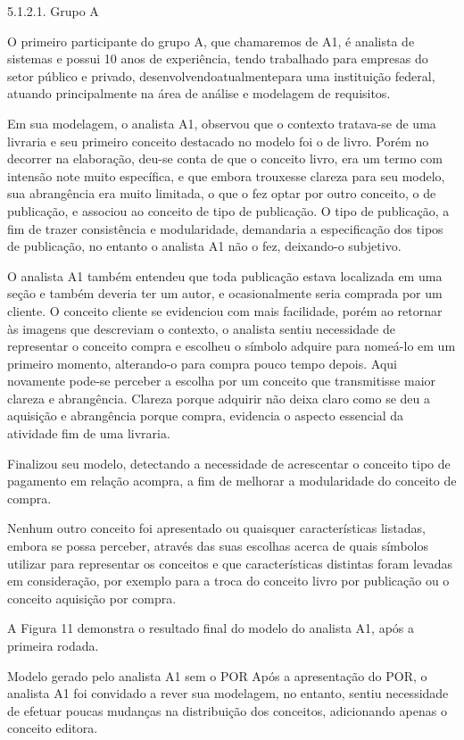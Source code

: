 5.1.2.1. Grupo A

O primeiro participante do grupo A, que chamaremos de A1, é analista de sistemas e possui 10 anos de experiência, tendo trabalhado para empresas do setor público e privado, desenvolvendoatualmentepara uma instituição federal, atuando principalmente na área de análise e modelagem de requisitos.

Em sua modelagem, o analista A1, observou que o contexto tratava-se de uma livraria e seu primeiro conceito destacado no modelo foi o de livro. Porém no decorrer na elaboração, deu-se conta de que o conceito livro, era um termo com intensão note muito específica, e que embora trouxesse clareza para seu modelo, sua abrangência era muito limitada, o que o fez optar por outro conceito, o de publicação, e associou ao conceito de tipo de publicação. O tipo de publicação, a fim de trazer consistência e modularidade, demandaria a especificação dos tipos de publicação, no entanto o analista A1 não o fez, deixando-o subjetivo.

O analista A1 também entendeu que toda publicação estava localizada em uma seção e também deveria ter um autor, e ocasionalmente seria comprada por um cliente. O conceito cliente se evidenciou com mais facilidade, porém ao retornar às imagens que descreviam o contexto, o analista sentiu necessidade de representar o conceito compra e escolheu o símbolo adquire para nomeá-lo em um primeiro momento, alterando-o para compra pouco tempo depois. Aqui novamente pode-se perceber a escolha por um conceito que transmitisse maior clareza e abrangência. Clareza porque adquirir não deixa claro como se deu a aquisição e abrangência porque compra, evidencia o aspecto essencial da atividade fim de uma livraria.

Finalizou seu modelo, detectando a necessidade de acrescentar o conceito tipo de pagamento em relação acompra, a fim de melhorar a modularidade do conceito de compra.

Nenhum outro conceito foi apresentado ou quaisquer características listadas, embora se possa perceber, através das suas escolhas acerca de quais símbolos utilizar para representar os conceitos e que características distintas foram levadas em consideração, por exemplo para a troca do conceito livro por publicação ou o conceito aquisição por compra.

A Figura 11 demonstra o resultado final do modelo do analista A1, após a primeira rodada.


Modelo gerado pelo analista A1 sem o POR
Após a apresentação do POR, o analista A1 foi convidado a rever sua modelagem, no entanto, sentiu necessidade de efetuar poucas mudanças na distribuição dos conceitos, adicionando apenas o conceito editora.

